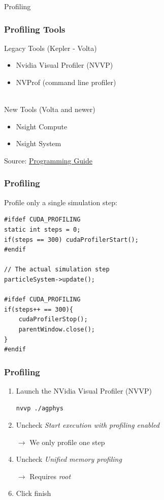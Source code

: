 \documentclass[aspectratio=169,handout]{beamer}
\begin{document}
\frame
{
\begin{center}
\Large Profiling
\end{center}
}


\begin{frame}[fragile]
\frametitle{Profiling Tools}
Legacy Tools (Kepler - Volta)
\begin{itemize}
	\item Nvidia Visual Profiler (NVVP)
	\item NVProf (command line profiler)
\end{itemize}
\hrulefill \\
New Tools (Volta and newer)
\begin{itemize}
	\item Nsight Compute
	\item Nsight System
\end{itemize}
\vspace{0.5cm}
Source: \href{https://docs.nvidia.com/cuda/profiler-users-guide/index.html#migrating-to-nsight-tools}{Programming Guide}
\end{frame}


\begin{frame}[fragile]
\frametitle{Profiling}
Profile only a single simulation step:

\begin{lstlisting}
#ifdef CUDA_PROFILING
static int steps = 0;
if(steps == 300) cudaProfilerStart();
#endif

// The actual simulation step
particleSystem->update();

#ifdef CUDA_PROFILING
if(steps++ == 300){
	cudaProfilerStop();
	parentWindow.close();
}
#endif

\end{lstlisting}
\end{frame}




\begin{frame}[fragile]
\frametitle{Profiling}

	\begin{minipage}{0.5\linewidth}
		\begin{enumerate}
			\item 		Launch the NVidia Visual Profiler (NVVP)
\begin{lstlisting}[language=bash]
nvvp ./agphys
\end{lstlisting}
			\item Uncheck \textit{Start execution with profiling enabled}
			\item[$\rightarrow$] We only profile one step
			\item Uncheck \textit{Unified memory profiling}
			\item[$\rightarrow$] Requires \textit{root}
			\item Click finish
		\end{enumerate}


\end{minipage}
\begin{minipage}{0.47\linewidth}

\end{minipage}
\end{frame}
\end{document}
